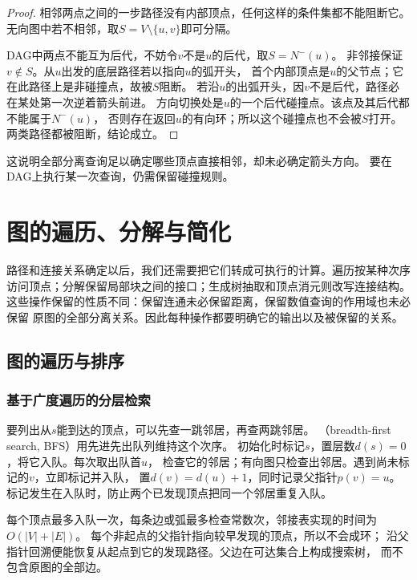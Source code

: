 \begin{proof}
相邻两点之间的一步路径没有内部顶点，任何这样的条件集都不能阻断它。
无向图中若不相邻，取\(S=V\setminus\{u,v\}\)即可分隔。

DAG中两点不能互为后代，不妨令\(v\)不是\(u\)的后代，取\(S=N^-(u)\)。
非邻接保证\(v\notin S\)。从\(u\)出发的底层路径若以指向\(u\)的弧开头，
首个内部顶点是\(u\)的父节点；它在此路径上是非碰撞点，故被\(S\)阻断。
若沿\(u\)的出弧开头，因\(v\)不是后代，路径必在某处第一次逆着箭头前进。
方向切换处是\(u\)的一个后代碰撞点。该点及其后代都不能属于\(N^-(u)\)，
否则存在返回\(u\)的有向环；所以这个碰撞点也不会被\(S\)打开。
两类路径都被阻断，结论成立。
\end{proof}

这说明全部分离查询足以确定哪些顶点直接相邻，却未必确定箭头方向。
要在DAG上执行某一次查询，仍需保留碰撞规则。

\section{图的遍历、分解与简化}
\label{sec:graph-theory-traversal-separation-decomposition}

路径和连接关系确定以后，我们还需要把它们转成可执行的计算。遍历按某种次序
访问顶点；分解保留局部块之间的接口；生成树抽取和顶点消元则改写连接结构。
这些操作保留的性质不同：保留连通未必保留距离，保留数值查询的作用域也未必保留
原图的全部分离关系。因此每种操作都要明确它的输出以及被保留的关系。

\subsection{图的遍历与排序}

\subsubsection{基于广度遍历的分层检索}
\label{sec:graph-theory-bfs}

要列出从\(s\)能到达的顶点，可以先查一跳邻居，再查两跳邻居。
（breadth-first search, BFS）用先进先出队列维持这个次序。
初始化时标记\(s\)，置层数\(d(s)=0\)，将它入队。每次取出队首\(u\)，
检查它的邻居；有向图只检查出邻居。遇到尚未标记的\(v\)，立即标记并入队，
置\(d(v)=d(u)+1\)，同时记录父指针\(p(v)=u\)。
标记发生在入队时，防止两个已发现顶点把同一个邻居重复入队。

每个顶点最多入队一次，每条边或弧最多检查常数次，邻接表实现的时间为
\(O(|V|+|E|)\)。
每个非起点的父指针指向较早发现的顶点，所以不会成环；
沿父指针回溯便能恢复从起点到它的发现路径。父边在可达集合上构成搜索树，
而不包含原图的全部边。

